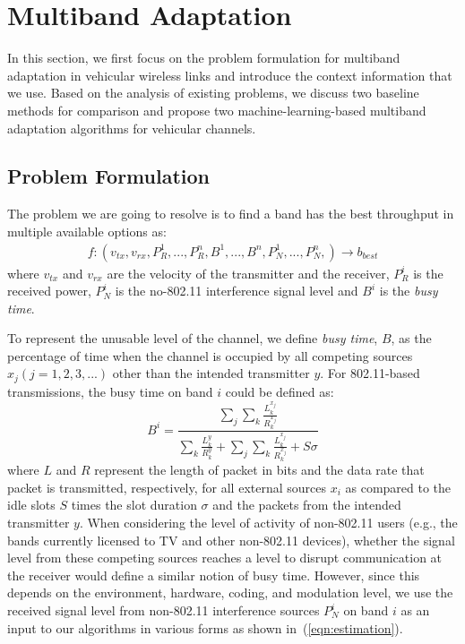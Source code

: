 \section{Multiband Adaptation}
\label{sec:model}
In this section, we first focus on the problem formulation for multiband 
adaptation in vehicular wireless links and introduce the context information 
that we use. Based on the analysis of existing problems, we discuss two 
baseline methods for comparison and propose two machine-learning-based 
multiband adaptation algorithms for vehicular channels.

\subsection{Problem Formulation}
The problem we are going to resolve is to find a band has the best throughput in multiple available options as:
\begin{align}
\label{eqn:estimation}
f: (v_{tx}, v_{rx},  P_R^1,..., P_R^n, B^1, ..., B^n,P_N^1,..., P_N^n,) \rightarrow b_{best}
 \end{align}
where $v_{tx}$ and $v_{rx}$ are the velocity of the transmitter and the receiver, 
$P_R^i$ is the received power, $P_N^i$ is the no-802.11 interference signal level and
$B^i$ is the \emph{busy time}.


To represent the unusable level of the channel, we define \emph{busy time}, $B$,
as the percentage of time when the channel is occupied by 
all competing sources $x_j ( j = 1, 2, 3, ...)$ other than the intended transmitter $y$. 
For 802.11-based transmissions, the busy time on band $i$ could be defined as:
\begin{equation}
\label{eqn:80211activity}
B^i = \frac{\sum_j{\sum_k{\frac{L_k^{x_j}}{R_k^{x_j}}}}}{\sum_k{\frac{L_k^y}{R_k^y}}+\sum_j{\sum_k{\frac{L_k^{x_j}}{R_k^{x_j}}}}+S\sigma}
\end{equation}
where $L$ and $R$ represent the length of packet in bits and the data
rate that packet is transmitted, respectively, for all external sources $x_i$
as compared to the idle slots $S$ times the slot duration $\sigma$ and
the packets from the intended transmitter $y$. When considering the level of
activity of non-802.11 users (e.g., the bands currently licensed to TV 
and other non-802.11 devices), whether the signal level from these
competing sources reaches a level to disrupt communication at the receiver
would define a similar notion of busy time. However, since this depends
on the environment, hardware, coding, and modulation level, we use
the received signal level from non-802.11 interference sources $P_N^i$ 
on band $i$ as an input to our algorithms in various forms as shown 
in~(\ref{eqn:estimation}).

